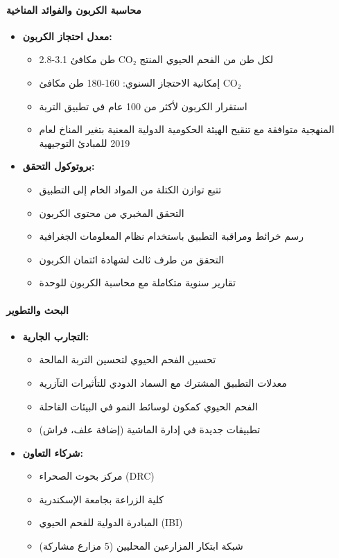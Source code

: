 \paragraph{محاسبة الكربون والفوائد المناخية}
\label{sec:biochar_carbon_capture}
\begin{itemize}
    \item \textbf{معدل احتجاز الكربون:}
    \begin{itemize}
        \item 2.8-3.1 طن مكافئ CO₂ لكل طن من الفحم الحيوي المنتج
        \item إمكانية الاحتجاز السنوي: 160-180 طن مكافئ CO₂
        \item استقرار الكربون لأكثر من 100 عام في تطبيق التربة
        \item المنهجية متوافقة مع تنقيح الهيئة الحكومية الدولية المعنية بتغير المناخ لعام 2019 للمبادئ التوجيهية
    \end{itemize}
    
    \item \textbf{بروتوكول التحقق:}
    \begin{itemize}
        \item تتبع توازن الكتلة من المواد الخام إلى التطبيق
        \item التحقق المخبري من محتوى الكربون
        \item رسم خرائط ومراقبة التطبيق باستخدام نظام المعلومات الجغرافية
        \item التحقق من طرف ثالث لشهادة ائتمان الكربون
        \item تقارير سنوية متكاملة مع محاسبة الكربون للوحدة
    \end{itemize}
\end{itemize}

\paragraph{البحث والتطوير}
\begin{itemize}
    \item \textbf{التجارب الجارية:}
    \begin{itemize}
        \item تحسين الفحم الحيوي لتحسين التربة المالحة
        \item معدلات التطبيق المشترك مع السماد الدودي للتأثيرات التآزرية
        \item الفحم الحيوي كمكون لوسائط النمو في البيئات القاحلة
        \item تطبيقات جديدة في إدارة الماشية (إضافة علف، فراش)
    \end{itemize}
    
    \item \textbf{شركاء التعاون:}
    \begin{itemize}
        \item مركز بحوث الصحراء (DRC)
        \item كلية الزراعة بجامعة الإسكندرية
        \item المبادرة الدولية للفحم الحيوي (IBI)
        \item شبكة ابتكار المزارعين المحليين (5 مزارع مشاركة)
    \end{itemize}
\end{itemize}

